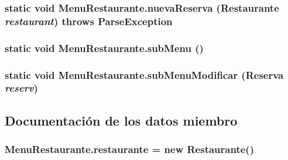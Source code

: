 \subsubsection[{nuevaReserva}]{\setlength{\rightskip}{0pt plus 5cm}static void MenuRestaurante.nuevaReserva ({\bf Restaurante} {\em restaurant})  throws ParseException \hspace{0.3cm}{\tt  [static]}}\label{class_menu_restaurante_653b26f6e6bf72e2137a17bf5792e1d4}


\subsubsection[{subMenu}]{\setlength{\rightskip}{0pt plus 5cm}static void MenuRestaurante.subMenu ()\hspace{0.3cm}{\tt  [static]}}\label{class_menu_restaurante_d27887dc03956e01fc55cacfc9f9cbc9}


\subsubsection[{subMenuModificar}]{\setlength{\rightskip}{0pt plus 5cm}static void MenuRestaurante.subMenuModificar ({\bf Reserva} {\em reserv})\hspace{0.3cm}{\tt  [static]}}\label{class_menu_restaurante_d6b929a0ca3a24b3575a44678075aebf}




\subsection{Documentación de los datos miembro}
\subsubsection[{restaurante}]{ {\bf MenuRestaurante.restaurante} = new {\bf Restaurante}()\hspace{0.3cm}{\tt  [static, package]}}\label{class_menu_restaurante_b6c9ce240ddfcdc67bd0060d30a66e0b}


